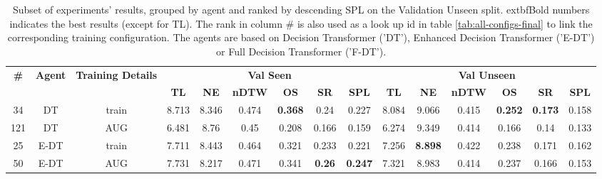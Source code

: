 \begin{table}
\centering
\caption{\label{tab:env_drop}Subset of experiments' results, grouped by agent and ranked by descending SPL on the Validation Unseen split. 	extbf{Bold} numbers indicates the best results (except for TL). The rank in column \# is also used as a look up id in table \ref{tab:all-configs-final} to link the corresponding training configuration.     \newline The agents are based on Decision Transformer ('DT'), Enhanced Decision Transformer ('E-DT') or Full Decision Transformer ('F-DT').}
\begin{tabular}{@{\hskip3pt}c@{\hskip3pt}c@{\hskip3pt}c@{\hskip3pt}c@{\hskip3pt}c@{\hskip3pt}c@{\hskip3pt}c@{\hskip3pt}c@{\hskip3pt}c@{\hskip3pt}c@{\hskip3pt}c@{\hskip3pt}c@{\hskip3pt}c@{\hskip3pt}c@{\hskip3pt}c}
\toprule
\textbf{\#} & \textbf{Agent} & \textbf{Training Details} & \multicolumn{6}{c}{\textbf{Val Seen}} & \multicolumn{6}{c}{\textbf{Val Unseen}} \\
 \textbf{~} &     \textbf{~} &                \textbf{~} &       \textbf{TL} &     \textbf{NE} &   \textbf{nDTW} &     \textbf{OS} &    \textbf{SR} &    \textbf{SPL} &         \textbf{TL} &     \textbf{NE} &   \textbf{nDTW} &     \textbf{OS} &     \textbf{SR} &    \textbf{SPL} \\
\midrule
         34 &             DT &                     train &             8.713 &           8.346 &           0.474 &  \textbf{0.368} &           0.24 &           0.227 &               8.084 &           9.066 &           0.415 &  \textbf{0.252} &  \textbf{0.173} &           0.158 \\
        121 &             DT &                       AUG &             6.481 &            8.76 &            0.45 &           0.208 &          0.166 &           0.159 &               6.274 &           9.349 &           0.414 &           0.166 &            0.14 &           0.133 \\
         25 &           E-DT &                     train &             7.711 &           8.443 &           0.464 &           0.321 &          0.233 &           0.221 &               7.256 &  \textbf{8.898} &           0.422 &           0.238 &           0.171 &           0.162 \\
         50 &           E-DT &                       AUG &             7.731 &           8.217 &           0.471 &           0.341 &  \textbf{0.26} &  \textbf{0.247} &               7.321 &           8.983 &           0.414 &           0.237 &           0.166 &           0.153 \\

\end{tabular}
\end{table}
